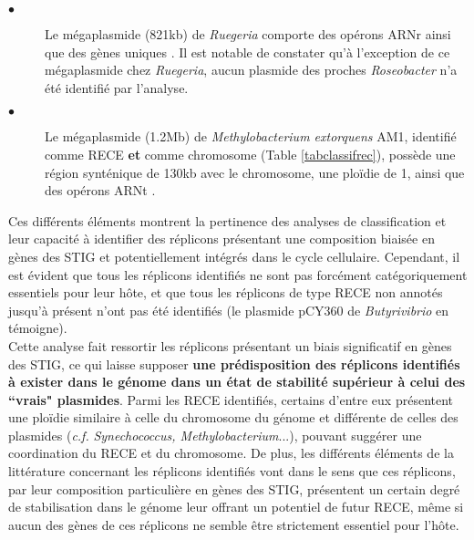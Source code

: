 \begin{description}
\item[$\bullet$] Le mégaplasmide (821kb) de \textit{Ruegeria} comporte des opérons ARNr ainsi que des gènes uniques \citep{moran2007ecological}. Il est notable de constater qu'à l'exception de ce mégaplasmide chez \textit{Ruegeria}, aucun plasmide des proches \textit{Roseobacter} n'a été identifié par l'analyse.
	 \item[$\bullet$] Le mégaplasmide (1.2Mb) de \textit{Methylobacterium extorquens} AM1, identifié comme RECE \textbf{et} comme chromosome (Table \ref{tabclassifrec}), possède une région synténique de 130kb avec le chromosome, une ploïdie de 1, ainsi que des opérons ARNt \citep{vuilleumier2009methylobacterium}.  
\end{description}
	Ces différents éléments montrent la pertinence des analyses de classification et leur capacité à identifier des réplicons présentant une composition biaisée en gènes des STIG et potentiellement intégrés dans le cycle cellulaire. Cependant, il est évident que tous les réplicons identifiés ne sont pas forcément catégoriquement essentiels pour leur hôte, et que tous les réplicons de type RECE non annotés jusqu'à présent n'ont pas été identifiés (le plasmide pCY360 de \textit{Butyrivibrio} en témoigne). \\
	Cette analyse fait ressortir les réplicons présentant un biais significatif en gènes des STIG, ce qui laisse supposer \textbf{\color{orange} une prédisposition des réplicons identifiés à exister dans le génome dans un état de stabilité supérieur à celui des ``vrais" plasmides}. Parmi les RECE identifiés, certains d'entre eux présentent une ploïdie similaire à celle du chromosome du génome et différente de celles des plasmides (\textit{c.f.} \textit{Synechococcus, Methylobacterium}...), pouvant suggérer une coordination du RECE et du chromosome. De plus, les différents éléments de la littérature concernant les réplicons identifiés vont dans le sens que ces réplicons, par leur composition particulière en gènes des STIG, présentent un certain degré de stabilisation dans le génome leur offrant un potentiel de futur RECE, même si aucun des gènes de ces réplicons ne semble être strictement essentiel pour l'hôte.
	